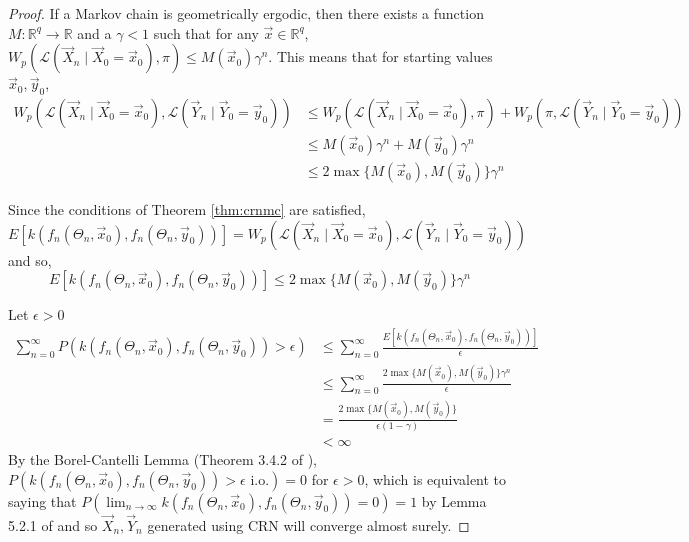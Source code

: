 \documentclass[12pt]{article}
\theoremstyle{plain}%
\theoremstyle{definition}
\begin{document}
		\begin{proof}
				If a Markov chain is geometrically ergodic, then there exists a function $M:\mathbb{R}^q\to \mathbb{R}$ and a $\gamma<1$ such that for any $\vec{x}\in \mathbb{R}^q$, $W_p(\mathcal{L}(\vec{X}_n\mid \vec{X}_0=\vec{x}_0),\pi)\leq M(\vec{x}_0)\gamma^n$. This means that for starting values $\vec{x}_0,\vec{y}_0$,
				\begin{align*}
						W_p(\mathcal{L}(\vec{X}_n\mid \vec{X}_0=\vec{x}_0),\mathcal{L}(\vec{Y}_n\mid \vec{Y}_0=\vec{y}_0))&\leq W_p(\mathcal{L}(\vec{X}_n\mid \vec{X}_0=\vec{x}_0),\pi)+ W_p(\pi,\mathcal{L}(\vec{Y}_n\mid \vec{Y}_0=\vec{y}_0))\\
						&\leq M(\vec{x}_0)\gamma^n + M(\vec{y}_0)\gamma^n\\
						&\leq 2\max\{M(\vec{x}_0), M(\vec{y}_0)\}\gamma^n
					\end{align*}
				
				Since the conditions of Theorem \ref{thm:crnmc} are satisfied, $E[k(f_n(\Theta_n,\vec{x}_0),f_n(\Theta_n,\vec{y}_0))]=W_p(\mathcal{L}(\vec{X}_n\mid \vec{X}_0=\vec{x}_0),\mathcal{L}(\vec{Y}_n\mid \vec{Y}_0=\vec{y}_0))$ and so,
				$$E[k(f_n(\Theta_n,\vec{x}_0),f_n(\Theta_n,\vec{y}_0))]\leq 2\max\{M(\vec{x}_0), M(\vec{y}_0)\}\gamma^n$$
				
				Let $\epsilon>0$
				\begin{align*}
						\sum_{n=0}^{\infty}P(k(f_n(\Theta_n,\vec{x}_0),f_n(\Theta_n,\vec{y}_0))>\epsilon)&\leq 	\sum_{n=0}^{\infty}\frac{E[k(f_n(\Theta_n,\vec{x}_0),f_n(\Theta_n,\vec{y}_0))]}{\epsilon}\\
						&\leq \sum_{n=0}^{\infty}\frac{2\max\{M(\vec{x}_0), M(\vec{y}_0)\}\gamma^n}{\epsilon}\\
						&=\frac{2\max\{M(\vec{x}_0), M(\vec{y}_0)\}}{\epsilon(1-\gamma)}\\
						&<\infty
					\end{align*}
				By the Borel-Cantelli Lemma (Theorem 3.4.2 of \cite{firstlook}), $P(k(f_n(\Theta_n,\vec{x}_0),f_n(\Theta_n,\vec{y}_0))>\epsilon \text{ i.o.})=0$ for $\epsilon>0$, which is equivalent to saying that $P(\lim_{n\to\infty}k(f_n(\Theta_n,\vec{x}_0),f_n(\Theta_n,\vec{y}_0))=0)=1$ by Lemma 5.2.1 of \cite{firstlook} and so $\vec{X}_n, \vec{Y}_n$ generated using CRN will converge almost surely. 
			\end{proof}
\end{document}
